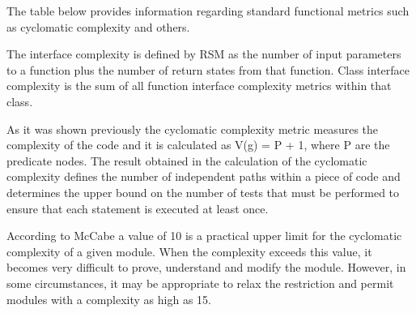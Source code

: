 The table below provides information regarding standard functional metrics such as cyclomatic complexity and others. 

The interface complexity is defined by RSM as the number of input parameters to a function plus the number of return states from that function. Class interface complexity is the sum of all function interface complexity metrics within that class. 

As it was shown previously the cyclomatic complexity metric measures the complexity of the code and it is calculated as V(g) = P + 1, where P are the predicate nodes. 
The result obtained in the calculation of the cyclomatic complexity defines the number of independent paths within a piece of code and determines the upper bound on the number of tests that must be performed to ensure that each statement is executed at least once.

According to McCabe a value of 10 is a practical upper limit for the cyclomatic complexity of a given module. When the complexity exceeds this value, it becomes very difficult to prove, understand and modify the module. However, in some circumstances, it may be appropriate to relax the restriction and permit modules with a complexity as high as 15.


